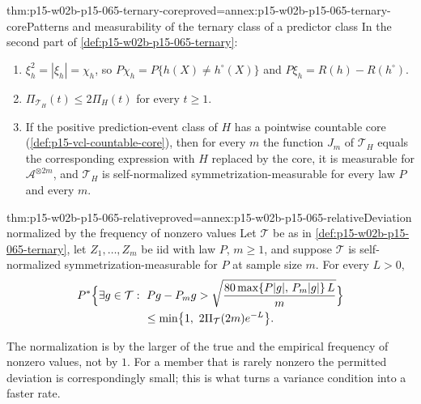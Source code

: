 \begin{hblemma}{thm:p15-w02b-p15-065-ternary-core}{proved=annex:p15-w02b-p15-065-ternary-core}{Patterns and measurability of the ternary class of a predictor class}
In the second part of \cref{def:p15-w02b-p15-065-ternary}:
\begin{enumerate}
\item \(\xi_h^2=|\xi_h|=\chi_h\), so \(P\chi_h=P\{h(X)\ne h^{\circ}(X)\}\)
      and \(P\xi_h=R(h)-R(h^{\circ})\).
\item \(\Pi_{\mathcal T_H}(t)\leq2\Pi_H(t)\) for every \(t\geq1\).
\item If the positive prediction-event class of \(H\) has a pointwise
      countable core (\cref{def:p15-vcl-countable-core}), then for every
      \(m\) the function \(J_m\) of \(\mathcal T_H\) equals the
      corresponding expression with \(H\) replaced by the core, it is
      measurable for \(\mathcal A^{\otimes2m}\), and \(\mathcal T_H\) is
      self-normalized symmetrization-\allowbreak measurable for every law
      \(P\) and every \(m\).
\end{enumerate}
\end{hblemma}

\begin{hblemma}{thm:p15-w02b-p15-065-relative}{proved=annex:p15-w02b-p15-065-relative}{Deviation normalized by the frequency of nonzero values}
Let \(\mathcal T\) be as in \cref{def:p15-w02b-p15-065-ternary}, let
\(Z_1,\ldots,Z_m\) be iid with law \(P\), \(m\geq1\), and suppose
\(\mathcal T\) is self-normalized symmetrization-\allowbreak measurable
for \(P\) at sample size \(m\). For every \(L>0\),
\begin{multline*}
 P^{*}\Bigl\{\exists g\in\mathcal T:\ Pg-P_mg>
 \sqrt{\frac{80\max\{P|g|,\,P_m|g|\}\,L}{m}}\Bigr\}\\
 \leq\min\bigl\{1,\ 2\Pi_{\mathcal T}(2m)e^{-L}\bigr\}.
\end{multline*}
\end{hblemma}

The normalization is by the larger of the true and the empirical
frequency of nonzero values, not by \(1\). For a member that is rarely
nonzero the permitted deviation is correspondingly small; this is what
turns a variance condition into a faster rate.

